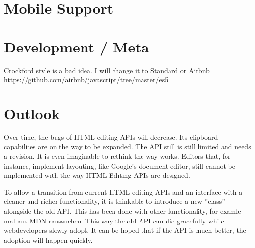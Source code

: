 

\section{Mobile Support}
\section{Development / Meta}
Crockford style is a bad idea. 
I will change it to Standard or Airbnb 
\url{https://github.com/airbnb/javascript/tree/master/es5}


\section{Outlook}

Over time, the bugs of HTML editing APIs will decrease. Its clipboard capabilites are on the way to be expanded. The API still is still limited and needs a revision. It is even imaginable to rethink the way  works. Editors that, for instance, implement layouting, like Google's document editor, still cannot be implemented with the way HTML Editing APIs are designed.

To allow a transition from current HTML editing APIs and an interface with a cleaner and richer functionality, it is thinkable to introduce a new ''class'' alongside the old API. This has been done with other functionality, for examle mal aus MDN raussuchen. This way the old API can die gracefully while webdevelopers slowly adopt. It can be hoped that if the API is much better, the adoption will happen quickly.